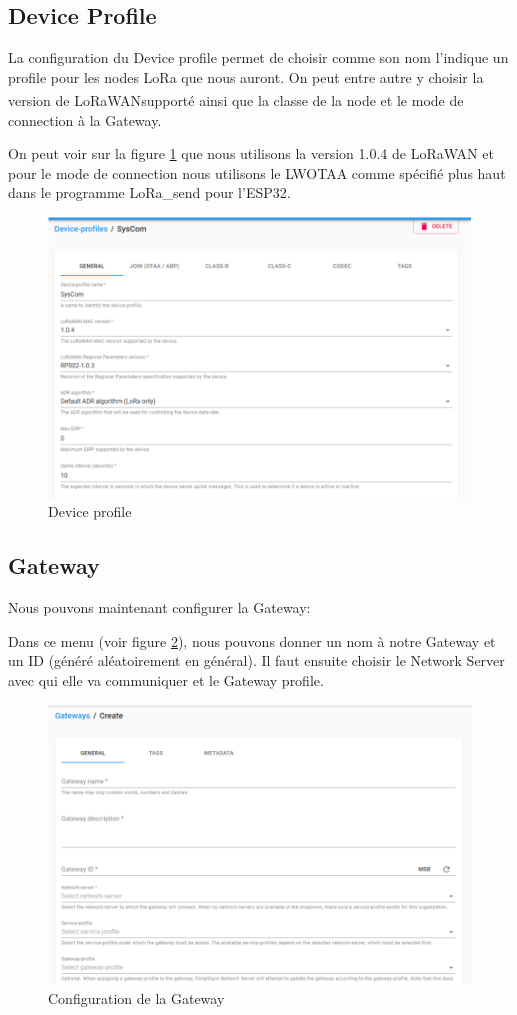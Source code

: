 \documentclass{article}
\begin{document}
		\subsection{Device Profile}
			La configuration du Device profile permet de choisir comme son nom l'indique un profile pour les nodes LoRa que nous auront.
			On peut entre autre y choisir la version de LoRaWAN\textsuperscript\textregistered supporté ainsi que la classe de la node et le mode de connection à la Gateway.
			
			On peut voir sur la figure \ref{fig:device-profile} que nous utilisons la version 1.0.4 de LoRaWAN et pour le mode de connection nous utilisons le LWOTAA comme spécifié plus haut dans le programme LoRa\_send pour l'ESP32.
						
			\begin{figure}[H]
				\centering
				\includegraphics[width=0.7\linewidth]{device-profile}
				\caption{Device profile}
				\label{fig:device-profile}
			\end{figure}
			
		\subsection{Gateway}
			Nous pouvons maintenant configurer la Gateway:
			
			Dans ce menu (voir figure \ref{fig:gateway}), nous pouvons donner un nom à notre Gateway et un ID (généré aléatoirement en général). Il faut ensuite choisir le Network Server avec qui elle va communiquer et le Gateway profile.
			\begin{figure}[H]
				\centering
				\includegraphics[width=0.7\linewidth]{gateway}
				\caption{Configuration de la Gateway}
				\label{fig:gateway}
			\end{figure}
			
\end{document}
